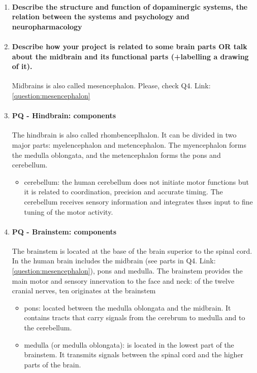 \documentclass[12pt,article,oneside,a4paper]{memoir}
\begin{document}
\begin{enumerate}
\item \paragraph{Describe the structure and function of dopaminergic systems, the relation between the systems and psychology and neuropharmacology}

\item \paragraph{Describe how your project is related to some brain parts OR talk about the midbrain and its functional parts (+labelling a drawing of it).}
Midbrains is also called mesencephalon. Please, check Q4. Link: \ref{question:mesencephalon}

\item \paragraph{PQ - Hindbrain: components}
The hindbrain is also called rhombenceplhalon. It can be divided in two major parts: myelencephalon and metencephalon. The myencephalon forms the medulla oblongata, and the metencephalon forms the pons and cerebellum.
\begin{itemize}
\item cerebellum: the human cerebellum does not initiate motor functions but it is related to coordination, precision and accurate timing. The cerebellum receives sensory information and integrates thses input to fine tuning of the motor activity.
\end{itemize}

\item \paragraph{PQ - Brainstem: components}
The brainstem is located at the base of the brain superior to the spinal cord. In the human brain includes the midbrain (see parts in Q4. Link:\ref{question:mesencephalon}), pons and medulla. The brainstem provides the main motor and sensory innervation to the face and neck: of the twelve cranial nerves, ten originates at the brainstem
\begin{itemize}
\item pons: located between the medulla oblongata and the midbrain. It contains tracts that carry signals from the cerebrum to medulla and to the cerebellum.
\item medulla (or medulla oblongata): is located in the lowest part of the brainstem. It transmits signals between the spinal cord and the higher parts of the brain.
\end{itemize}
\end{enumerate}
\end{document}

